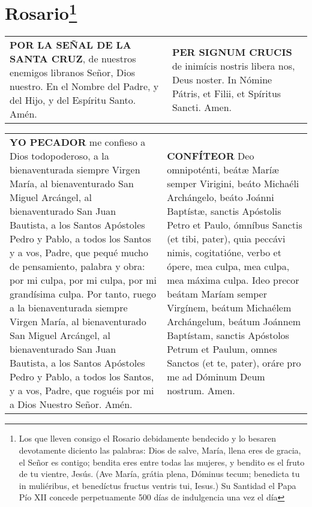 \documentclass[./rosary.tex]{subfiles}
\begin{document}
\chapter*{Rosario\footnote{Los que lleven consigo el Rosario debidamente bendecido y lo besaren devotamente diciento las palabras:
        Dios de salve, María, llena eres de gracia, el Señor es contigo; bendita eres entre todas las mujeres,
        y bendito es el fruto de tu vientre, Jesús. (Ave María, grátia plena, Dóminus tecum; benedicta tu in muliéribus, et benedíctus fructus ventris tui,
        Iesus.) Su Santidad el Papa Pío XII concede perpetuamente 500 días de indulgencia una vez el día}}

\label{crossSignal}
\begin{longtable} { p{} p{} }
    \textbf{POR LA SEÑAL DE LA SANTA CRUZ}, de nuestros enemigos libranos Señor, Dios nuestro. En el Nombre del Padre,
    y del Hijo, y del Espíritu Santo. Amén.

     &

    \textbf{PER SIGNUM CRUCIS} de inimícis nostris libera nos, Deus noster. In Nómine Pátris, et Filii, et Spíritus Sancti. Amen.
\end{longtable}

\label{iConfess}
\begin{longtable} { p{} p{} }
    \textbf{YO PECADOR} me confieso a Dios todopoderoso, a la bienaventurada siempre Virgen María, al bienaventurado San Miguel Arcángel,
    al bienaventurado San Juan Bautista, a los Santos Apóstoles Pedro y Pablo, a todos los Santos y a vos, Padre, que pequé mucho
    de pensamiento, palabra y obra: por mi culpa, por mi culpa, por mi grandísima culpa. Por tanto, ruego a la bienaventurada
    siempre Virgen María, al bienaventurado San Miguel Arcángel, al bienaventurado San Juan Bautista, a los Santos Apóstoles
    Pedro y Pablo, a todos los Santos, y a vos, Padre, que roguéis por mi a Dios Nuestro Señor. Amén.
     &
    \textbf{CONFÍTEOR} Deo omnipoténti, beátæ Maríæ semper Virigini, beáto Michaéli Archángelo, beáto Joánni Baptístæ, sanctis Apóstolis Petro et Paulo,
    ómníbus Sanctis (et tibi, pater), quia peccávi nimis, cogitatióne, verbo et ópere, mea culpa, mea culpa, mea máxima culpa. Ideo precor beátam
    Maríam semper Virgínem, beátum Michaélem Archángelum, beátum Joánnem Baptístam, sanctis Apóstolos Petrum et Paulum, omnes Sanctos (et te, pater),
    oráre pro me ad Dóminum Deum nostrum. Amen.
\end{longtable}
\end{document}
